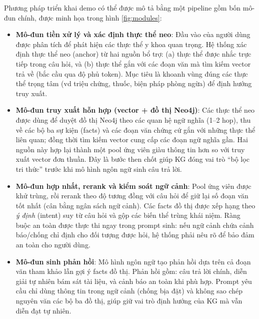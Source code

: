 \documentclass[conference]{IEEEtran}
\begin{document}
Phương pháp triển khai demo có thể được mô tả bằng một pipeline gồm bốn mô-đun chính, được minh họa trong hình \ref{fig:modules}:
\begin{itemize}
    \item \textbf{Mô-đun tiền xử lý và xác định thực thể neo}: Đầu vào của người dùng được phân tích để phát hiện các thực thể y khoa quan trọng. Hệ thống xác định thực thể neo (anchor) từ hai nguồn bổ trợ: (a) thực thể được nhắc trực tiếp trong câu hỏi, và (b) thực thể gắn với các đoạn văn mà tìm kiếm vector trả về (bắc cầu qua độ phủ token). Mục tiêu là khoanh vùng đúng các thực thể trọng tâm (vd triệu chứng, thuốc, biện pháp phòng ngừa) để định hướng truy xuất.
    \item \textbf{Mô-đun truy xuất hỗn hợp (vector + đồ thị Neo4j)}: Các thực thể neo được dùng để duyệt đồ thị Neo4j theo các quan hệ ngữ nghĩa (1--2 hop), thu về các bộ ba sự kiện (facts) và các đoạn văn chứng cứ gắn với những thực thể liên quan; đồng thời tìm kiếm vector cung cấp các đoạn ngữ nghĩa gần. Hai nguồn này hợp lại thành một pool ứng viên giàu thông tin hơn so với truy xuất vector đơn thuần. Đây là bước then chốt giúp KG đóng vai trò ``bộ lọc tri thức'' trước khi mô hình ngôn ngữ sinh câu trả lời.
    \item \textbf{Mô-đun hợp nhất, rerank và kiểm soát ngữ cảnh}: Pool ứng viên được khử trùng, rồi rerank theo độ tương đồng với câu hỏi để giữ lại số đoạn văn tốt nhất (cân bằng ngân sách ngữ cảnh). Các facts đồ thị được xếp hạng theo \emph{ý định} (intent) suy từ câu hỏi và gộp các biến thể trùng khái niệm. Ràng buộc an toàn được thực thi ngay trong prompt sinh: nếu ngữ cảnh chứa cảnh báo/chống chỉ định cho đối tượng được hỏi, hệ thống phải nêu rõ để bảo đảm an toàn cho người dùng.
    \item \textbf{Mô-đun sinh phản hồi}: Mô hình ngôn ngữ tạo phản hồi dựa trên cả đoạn văn tham khảo lẫn gợi ý facts đồ thị. Phản hồi gồm: câu trả lời chính, diễn giải tự nhiên bám sát tài liệu, và cảnh báo an toàn khi phù hợp. Prompt yêu cầu chỉ dùng thông tin trong ngữ cảnh (chống bịa đặt) và không sao chép nguyên văn các bộ ba đồ thị, giúp giữ vai trò định hướng của KG mà vẫn diễn đạt tự nhiên.
\end{itemize}
\end{document}
